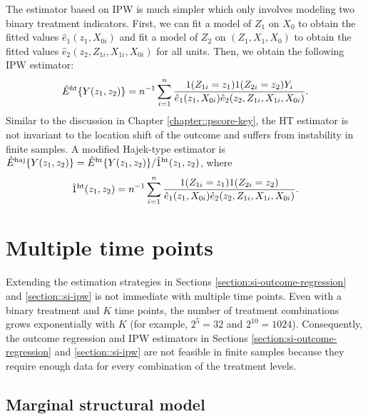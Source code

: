   
 
  
 
 The estimator based on IPW is much simpler which only involves modeling two binary treatment indicators. First, we can fit a model of $Z_1$ on $X_0$ to obtain the fitted values $\hat{e}_{1}(z_1, X_{0i})$ and fit a model of $Z_2$ on $(Z_1, X_1, X_0)$ to obtain the fitted values $\hat{e}_{2}(z_2, Z_{1i}, X_{1i}, X_{0i})$ for all units. Then, we obtain the following IPW estimator:
$$
\hat{E}^\textup{ht}\{ Y(z_1, z_2) \}  = n^{-1} \sum_{i=1}^n 
  \frac{  1(Z_{1i}=z_1) 1(Z_{2i}=z_2) Y_i  }{   \hat{e}_{1}(z_1, X_{0i}) \hat{e}_{2} (z_2, Z_{1i}, X_{1i}, X_{0i})   }  .
$$
Similar to the discussion in Chapter \ref{chapter::pscore-key}, the HT estimator is not invariant to the location shift of the outcome and suffers from instability in finite samples. A modified Hajek-type estimator is $\hat{E}^\textup{haj}\{ Y(z_1, z_2) \}  = \hat{E}^\textup{ht}\{ Y(z_1, z_2) \}   / \hat 1^\textup{ht}(z_1,z_2)$, where 
$$
\hat 1^\textup{ht}(z_1,z_2)  = n^{-1}  \sum_{i=1}^n 
  \frac{  1(Z_{1i}=z_1) 1(Z_{2i}=z_2)  }{   \hat{e}_{1} (z_1, X_{0i})\hat{e}_{2} (z_2, Z_{1i}, X_{1i}, X_{0i})   }  .
$$


 
 
  
 
 
 
 

\section{Multiple time points}


Extending the estimation strategies in Sections \ref{section:si-outcome-regression} and \ref{section::si-ipw} is not immediate with multiple time points. Even with a binary treatment and $K$ time points, the number of treatment combinations grows exponentially with $K$ (for example, $2^5 = 32$ and $2^{10} = 1024$). Consequently, the outcome regression and IPW estimators in Sections \ref{section:si-outcome-regression} and \ref{section::si-ipw} are not feasible in finite samples because they require enough data for every combination of the treatment levels. 


\subsection{Marginal structural model}

